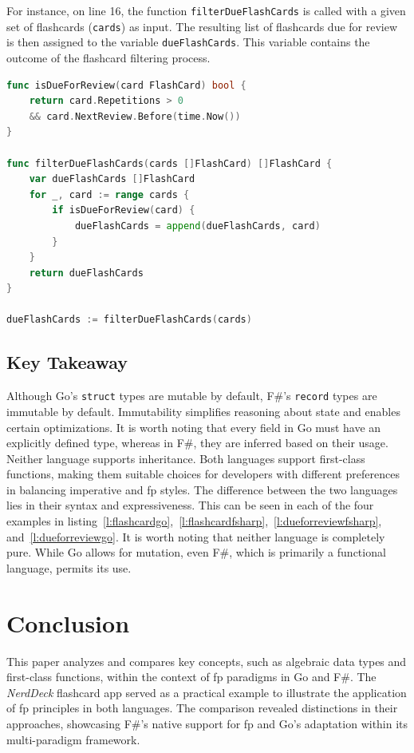     For instance, on line 16, the function \texttt{filterDueFlashCards} is called with a given set of flashcards (\texttt{cards}) as input. The resulting list of flashcards due for review is then assigned to the variable \texttt{dueFlashCards}. This variable contains the outcome of the flashcard filtering process.

\begin{lstlisting}[language=go, firstnumber=1, caption={First-class function reresentation in Go}, label=l:dueforreviewgo]
func isDueForReview(card FlashCard) bool {
    return card.Repetitions > 0 
    && card.NextReview.Before(time.Now())
}

func filterDueFlashCards(cards []FlashCard) []FlashCard {
    var dueFlashCards []FlashCard
    for _, card := range cards {
        if isDueForReview(card) {
            dueFlashCards = append(dueFlashCards, card)
        }
    }
    return dueFlashCards
}

dueFlashCards := filterDueFlashCards(cards)
\end{lstlisting}
            

    \section{Key Takeaway}\label{sec:keytakeaway}
    Although Go's \texttt{struct} types are mutable by default, F\#'s \texttt{record} types are immutable by default. Immutability simplifies reasoning about state and enables certain optimizations. It is worth noting that every field in Go must have an explicitly defined type, whereas in F\#, they are inferred based on their usage. Neither language supports inheritance. Both languages support first-class functions, making them suitable choices for developers with different preferences in balancing imperative and \ac{fp} styles. The difference between the two languages lies in their syntax and expressiveness. This can be seen in each of the four examples in listing\ \ref{l:flashcardgo},\ \ref{l:flashcardfsharp},\ \ref{l:dueforreviewfsharp}, and\ \ref{l:dueforreviewgo}. It is worth noting that neither language is completely pure. While Go allows for mutation, even F\#, which is primarily a functional language, permits its use.



\chapter{Conclusion}\label{chap:conclusion}
This paper analyzes and compares key concepts, such as algebraic data types and first-class functions, within the context of \ac{fp} paradigms in Go and F\#. The \textit{NerdDeck} flashcard \ac{app} served as a practical example to illustrate the application of \ac{fp} principles in both languages. The comparison revealed distinctions in their approaches, showcasing F\#'s native support for \ac{fp} and Go's adaptation within its multi-paradigm framework.

